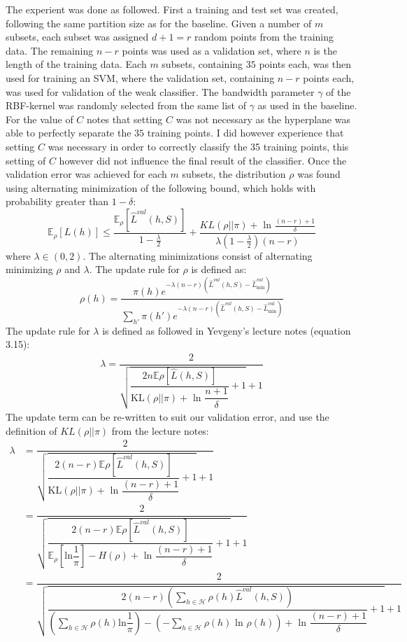 \documentclass{article}
\begin{document}
The experient was done as followed. First a training and test set was created, following the same partition size as for the baseline. Given a number of $m$ subsets, each subset was assigned $d+1=r$ random points from the training data. The remaining $n-r$ points was used as a validation set, where $n$ is the length of the training data. Each $m$ subsets, containing $35$ points each, was then used for training an SVM, where the validation set, containing $n-r$ points each, was used for validation of the weak classifier. The bandwidth parameter $\gamma$ of the RBF-kernel was randomly selected from the same list of $\gamma$ as used in the baseline. For the value of $C$ \cite{article} notes that setting $C$ was not necessary as the hyperplane was able to perfectly separate the $35$ training points. I did however experience that setting $C$ was necessary in order to correctly classify the 35 training points, this setting of $C$ however did not influence the final result of the classifier. Once the validation error was achieved for each $m$ subsets, the distribution $\rho$ was found using alternating minimization of the following bound, which holds with probability greater than $1- \delta$:
\begin{equation}
\label{eq:bound}
\mathbb{E}_\rho[L(h)] \leq \dfrac{\mathbb{E}_\rho [\hat{L}^{val}(h,S)]}{1- \frac{\lambda}{2}}+ \dfrac{KL(\rho || \pi) + \text{ ln } \frac{(n-r)+1}{\delta}}{\lambda(1-\frac{\lambda}{2})(n-r)}
\end{equation}
where $\lambda \in (0,2)$.
The alternating minimizations consist of alternating minimizing $\rho$ and $\lambda$. The update rule for $\rho$ is defined as:
\begin{equation}
\label{eq:min1}
\rho(h) = \dfrac{ \pi(h)e^{-\lambda(n-r) (\hat{L}^{val}(h,S)- \hat{L}^{val}_{\text{min}})}}{\sum_{h'} \pi(h') e^{-\lambda(n-r) (\hat{L}^{val}(h,S) - \hat{L}^{val}_{\text{min}})} }
\end{equation}
The update rule for $\lambda$ is defined as followed in Yevgeny's lecture notes (equation 3.15):
\begin{align}
\lambda = \dfrac{2}{ \sqrt{ \dfrac{2n \mathbb{E}\rho \left[\hat{L}(h,S)\right]}{ \text{KL}(\rho || \pi) + \text{ ln }\dfrac{n+1}{\delta}} +1 } +1}
\end{align}
The update term can be re-written to suit our validation error, and use the definition of $KL(\rho || \pi)$ from the lecture notes:
\begin{align}
\lambda &= \dfrac{2}{ \sqrt{ \dfrac{2(n-r) \mathbb{E}\rho \left[\hat{L}^{val}(h,S)\right]}{ \text{KL}(\rho || \pi) + \text{ ln }\dfrac{(n-r)+1}{\delta}} +1 } +1}\\
&= \dfrac{2}{ \sqrt{ \dfrac{2(n-r) \mathbb{E}\rho \left[\hat{L}^{val}(h,S)\right]}{ \mathbb{E}_\rho\left[ \text{ln}  \dfrac{1}{\pi} \right] - H(\rho) + \text{ ln }\dfrac{(n-r)+1}{\delta}} +1 } +1}\\
\label{eq:min2}
&= \dfrac{2}{ \sqrt{ \dfrac{2(n-r) \left( \sum\limits_{h \in \mathcal{H}} \rho(h) \hat{L}^{val}(h,S)\right)}{ \left( \sum\limits_{h \in \mathcal{H}}  \rho(h)  \text{ln}  \dfrac{1}{\pi} \right) - \left( - \sum\limits_{h \in \mathcal{H}} \rho(h) \text{ ln } \rho(h) \right) + \text{ ln }\dfrac{(n-r)+1}{\delta}} +1 } +1}
\end{align}
\end{document}
